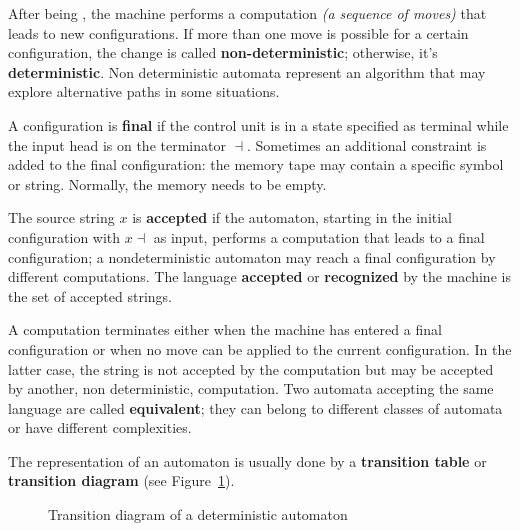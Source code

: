 \documentclass[english]{article}
\begin{document}
After being , the machine performs a computation \textit{(a sequence of moves)} that leads to new configurations.
If more than one move is possible for a certain configuration, the change is called \textbf{non-deterministic};
otherwise, it's \textbf{deterministic}.
Non deterministic automata represent an algorithm that may explore alternative paths in some situations.

A configuration is \textbf{final} if the control unit is in a state specified as terminal while the input head is on the terminator \(\dashv\).
Sometimes an additional constraint is added to the final configuration: the memory tape may contain a specific symbol or string.
Normally, the memory needs to be empty.

The source string \(x\) is \textbf{accepted} if the automaton, starting in the initial configuration with \(x \dashv\) as input, performs a computation that leads to a final configuration;
a nondeterministic automaton may reach a final configuration by different computations.
The language \textbf{accepted} or \textbf{recognized} by the machine is the set of accepted strings.

A computation terminates either when the machine has entered a final configuration or when no move can be applied to the current configuration.
In the latter case, the string is not accepted by the computation but may be accepted by another, non deterministic, computation.
Two automata accepting the same language are called \textbf{equivalent};
they can belong to different classes of automata or have different complexities.

\bigskip
The representation of an automaton is usually done by a \textbf{transition table} or \textbf{transition diagram} (see Figure~\ref{fig:transition-diagram}).

\begin{figure}[htbp]
  \centering
  \bigskip
  \bigskip
  \caption{Transition diagram of a deterministic automaton}
  \label{fig:transition-diagram}
\end{figure}
\end{document}
